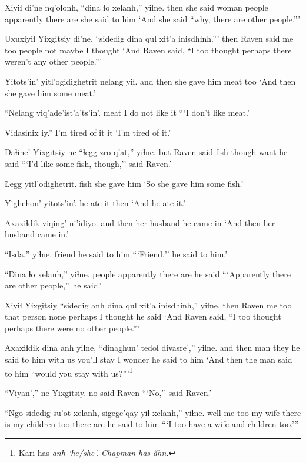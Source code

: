\documentclass[12pt]{article}
\begin{document}
\gll Xiyiɬ di'ne nq'oɬonh, ``dina  ɬo  xelanh,'' yiɬne.
then {she said} woman people  apparently {there are} {she said to him}
\glt `And she said ``why, there are other people.'''
\glend

\gll Uxuxiyiɬ  Yixgitsiy di'ne, ``sidedig dina qul xit'a inisdhinh.'''
then  Raven  said  {me too}  people not maybe {I thought}
\glt `And Raven said, ``I too thought perhaps there weren't any other people.'''
\glend

\gll Yitots'in' yitl'ogidighetrit nelang yiɬ.
{and then} {she gave him}  meat  too
\glt `And then she gave him some meat.'
\glend

\gll ``Nelang viq'ade'ist'a'ts'in'.
meat  {I do not like it}
\glt ```I don't like meat.'
\glend

\gll Vidasinix iy.''
{{I'm tired of it}} it
\glt `I'm tired of it.'
\glend

\gll Daɬine' Yixgitsiy ne ``ɬegg  zro  q'at,''  yiɬne.
but  Raven  said fish  though  want  {he said}
\glt ```I'd like some fish, though,'' said Raven.'
\glend

\gll Łegg yitl'odighetrit.
fish {she gave him}
\glt `So she gave him some fish.'
\glend

\gll Yighehon' yitots'in'.
{he ate it} then
\glt `And he ate it.'
\glend

\gll Axaxiɬdik viqing' ni'idiyo.
{and then} {her husband} {he came in}
\glt `And then her husband came in.'
\glend

\gll ``Isda,'' yiɬne.
friend  {he said to him}
\glt ```Friend,'' he said to him.'
\glend

\gll ``Dina ɬo  xelanh,'' yiɬne.
people apparently {there are} {he said}
\glt ```Apparently there are other people,'' he said.'
\glend

\gll Xiyiɬ Yixgitsiy ``sidedig anh dina qul xit'a  inisdhinh,'' yiɬne.
then Raven  {me too} that person none perhaps {I thought} {he said}
\glt `And Raven said, ``I too thought perhaps there were no other people.'''
\glend

\gll Axaxiɬdik dina anh yiɬne,  ``dinaghun' tedoɬ  divasre','' yiɬne.
{and then} man they {he said to him} {with us} {you'll stay} {I wonder} {he said to him}
\glt `And then the man said to him ``would you stay with us?'''\footnote{Kari has \em anh `he/she'. Chapman has \em \u{a}hn.}
\glend

\gll ``Viyan','' ne Yixgitsiy.
no  said Raven
\glt ```No,'' said Raven.'
\glend

\gll ``Ngo sidedig su'ot  xelanh, sigege'qay yiɬ xelanh,'' yiɬne.
well {me too}  {my wife} {there is}  {my children} too {there are}  {he said to him}
\glt ```I too have a wife and children too.'''
\glend
\end{document}
